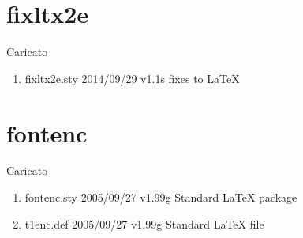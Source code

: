 \section{fixltx2e}

Caricato 
\begin{enumerate}
\item fixltx2e.sty 2014/09/29 v1.1s fixes to LaTeX
\end{enumerate}	
\section{fontenc}

Caricato 
\begin{enumerate}
\item fontenc.sty 2005/09/27 v1.99g Standard LaTeX package
\item t1enc.def 2005/09/27 v1.99g Standard LaTeX file
\end{enumerate}
